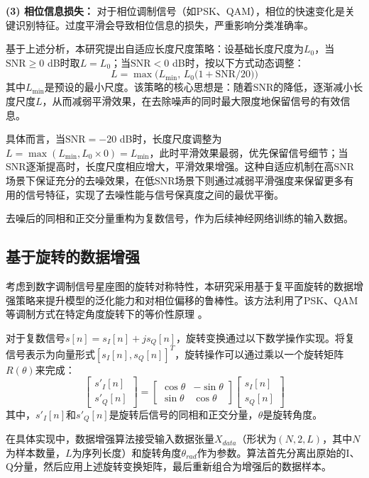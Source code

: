 \documentclass[conference]{IEEEtran}
\begin{document}
\textbf{(3) 相位信息损失：} 对于相位调制信号（如PSK、QAM），相位的快速变化是关键识别特征。过度平滑会导致相位信息的损失，严重影响分类准确率。

基于上述分析，本研究提出自适应长度尺度策略：设基础长度尺度为$L_0$，当$\mathrm{SNR}\ge0$ dB时取$L=L_0$；当$\mathrm{SNR}<0$ dB时，按以下方式动态调整：
\begin{equation}
L = \max\bigl(L_{\min},\,L_0\bigl(1+\mathrm{SNR}/20\bigr)\bigr)
\end{equation}
其中$L_{\min}$是预设的最小尺度。该策略的核心思想是：随着SNR的降低，逐渐减小长度尺度$L$，从而减弱平滑效果，在去除噪声的同时最大限度地保留信号的有效信息。

具体而言，当$\mathrm{SNR}=-20$ dB时，长度尺度调整为$L=\max(L_{\min}, L_0 \times 0)=L_{\min}$，此时平滑效果最弱，优先保留信号细节；当SNR逐渐提高时，长度尺度相应增大，平滑效果增强。这种自适应机制在高SNR场景下保证充分的去噪效果，在低SNR场景下则通过减弱平滑强度来保留更多有用的信号特征，实现了去噪性能与信号保真度之间的最优平衡。

去噪后的同相和正交分量重构为复数信号，作为后续神经网络训练的输入数据。
\subsection{基于旋转的数据增强}

考虑到数字调制信号星座图的旋转对称特性，本研究采用基于复平面旋转的数据增强策略来提升模型的泛化能力和对相位偏移的鲁棒性。该方法利用了PSK、QAM等调制方式在特定角度旋转下的等价性原理 \cite{}。

对于复数信号$s[n] = s_I[n] + js_Q[n]$，旋转变换通过以下数学操作实现。将复信号表示为向量形式$[s_I[n], s_Q[n]]^T$，旋转操作可以通过乘以一个旋转矩阵$R(\theta)$来完成：
\begin{equation}
\begin{bmatrix} s'_I[n] \\ s'_Q[n] \end{bmatrix} = \begin{bmatrix} \cos\theta & -\sin\theta \\ \sin\theta & \cos\theta \end{bmatrix} \begin{bmatrix} s_I[n] \\ s_Q[n] \end{bmatrix}
\end{equation}
其中，$s'_I[n]$和$s'_Q[n]$是旋转后信号的同相和正交分量，$\theta$是旋转角度。

在具体实现中，数据增强算法接受输入数据张量$X_{data}$（形状为$(N, 2, L)$，其中$N$为样本数量，$L$为序列长度）和旋转角度$\theta_{rad}$作为参数。算法首先分离出原始的I、Q分量，然后应用上述旋转变换矩阵，最后重新组合为增强后的数据样本。
\end{document}
